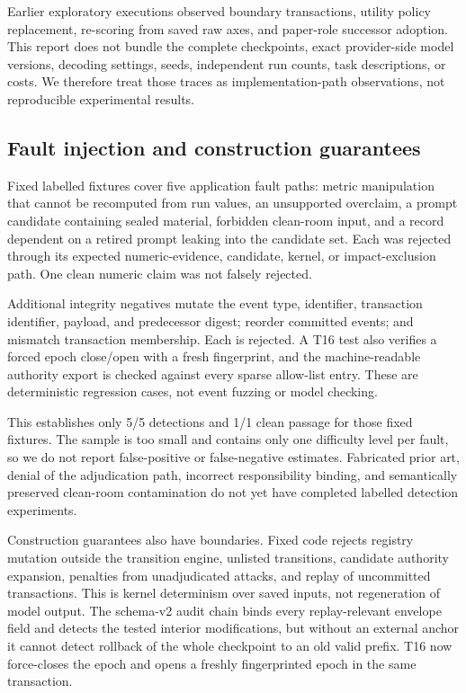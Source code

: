 Earlier exploratory executions observed boundary transactions, utility
policy replacement, re-scoring from saved raw axes, and paper-role
successor adoption. This report does not bundle the complete checkpoints,
exact provider-side model versions, decoding settings, seeds, independent
run counts, task descriptions, or costs. We therefore treat those traces
as implementation-path observations, not reproducible experimental
results.

\subsection{Fault injection and construction guarantees}\label{sec:eval:repro}

Fixed labelled fixtures cover five application fault paths: metric manipulation that
cannot be recomputed from run values, an unsupported overclaim, a prompt
candidate containing sealed material, forbidden clean-room input, and a
record dependent on a retired prompt leaking into the candidate set.
Each was rejected through its expected numeric-evidence, candidate,
kernel, or impact-exclusion path. One clean numeric claim was not falsely
rejected.

Additional integrity negatives mutate the event type, identifier,
transaction identifier, payload, and predecessor digest; reorder committed
events; and mismatch transaction membership. Each is rejected. A T16 test
also verifies a forced epoch close/open with a fresh fingerprint, and the
machine-readable authority export is checked against every sparse
allow-list entry. These are deterministic regression cases, not event
fuzzing or model checking.

This establishes only 5/5 detections and 1/1 clean passage for those fixed
fixtures. The sample is too small and contains only one difficulty level
per fault, so we do not report false-positive or false-negative estimates.
Fabricated prior art, denial of the adjudication path, incorrect
responsibility binding, and semantically preserved clean-room
contamination do not yet have completed labelled detection experiments.

Construction guarantees also have boundaries. Fixed code rejects
registry mutation outside the transition engine, unlisted transitions,
candidate authority expansion, penalties from unadjudicated attacks, and
replay of uncommitted transactions. This is kernel determinism over saved
inputs, not regeneration of model output. The schema-v2 audit chain binds
every replay-relevant envelope field and detects the tested interior
modifications, but without an external anchor it cannot detect rollback of
the whole checkpoint to an old valid prefix. T16 now force-closes the epoch
and opens a freshly fingerprinted epoch in the same transaction.

